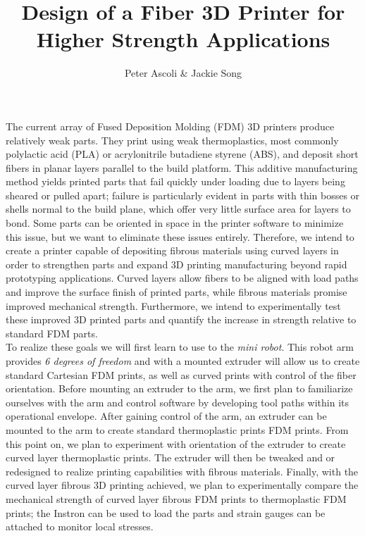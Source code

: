 \documentclass[letter,10pt,english]{article}
\begin{document}
\title{Design of a Fiber 3D Printer for Higher Strength Applications}
\author{Peter Ascoli \& Jackie Song}
\date{}

\maketitle

\thispagestyle{fancy}


The current array of Fused Deposition Molding (FDM) 3D printers produce relatively weak parts. They print using weak thermoplastics, most commonly polylactic acid (PLA) or acrylonitrile butadiene styrene (ABS), and deposit short fibers in planar layers parallel to the build platform. This additive manufacturing method yields printed parts that fail quickly under loading due to layers being sheared or pulled apart; failure is particularly evident in parts with thin bosses or shells normal to the build plane, which offer very little surface area for layers to bond. Some parts can be oriented in space in the printer software to minimize this issue, but we want to eliminate these issues entirely. Therefore, we intend to create a printer capable of depositing fibrous materials using curved layers in order to strengthen parts and expand 3D printing manufacturing beyond rapid prototyping applications. Curved layers allow fibers to be aligned with load paths and improve the surface finish of printed parts, while fibrous materials promise improved mechanical strength. Furthermore, we intend to experimentally test these improved 3D printed parts and quantify the increase in strength relative to standard FDM parts.\\


To realize these goals we will first learn to use to the \emph{mini robot}. This robot arm provides \emph{6 degrees of freedom} and with a mounted extruder will allow us to create standard Cartesian FDM prints, as well as curved prints with control of the fiber orientation. Before mounting an extruder to the arm, we first plan to familiarize ourselves with the arm and control software by developing tool paths within its operational envelope. After gaining control of the arm, an extruder can be mounted to the arm to create standard thermoplastic prints FDM prints. From this point on, we plan to experiment with orientation of the extruder to create curved layer thermoplastic prints. The extruder will then be tweaked and or redesigned to realize printing capabilities with fibrous materials. Finally, with the curved layer fibrous 3D printing achieved, we plan to experimentally compare the mechanical strength of curved layer fibrous FDM prints to thermoplastic FDM prints; the Instron can be used to load the parts and strain gauges can be attached to monitor local stresses.

\end{document}
